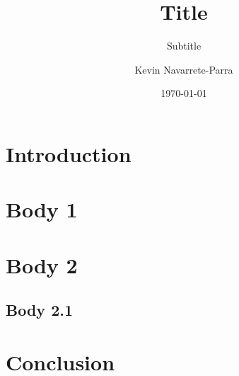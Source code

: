 \documentclass[authordate]{turabian-researchpaper}
\title{Title}
\subtitle{Subtitle}
\author{Kevin Navarrete-Parra}
\date{\today}
\begin{document}
\maketitle



\section{Introduction}

\lipsum[1]

\section{Body 1}
\lipsum[1-5]

\section{Body 2}

\lipsum[1][1-2]
\begin{quotation}
    \lipsum[10][1-4]\autocite{test-doc}
\end{quotation}

\subsection{Body 2.1}
\lipsum[1-3]

\section{Conclusion}
\lipsum[1]

\clearpage
\printbibliography
\end{document}
